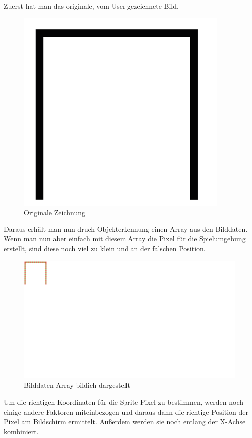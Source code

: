 Zuerst hat man das originale, vom User gezeichnete Bild.
\begin{figure}[H]
    \centering
    \includegraphics[scale=0.5]{pics/simpleDrawing.PNG}
    \caption{Originale Zeichnung}
\end{figure}

Daraus erhält man nun druch Objekterkennung einen Array aus den Bilddaten. Wenn man nun aber einfach mit diesem Array 
die Pixel für die Spielumgebung erstellt, sind diese noch viel zu klein und an der falschen Position.
\\
\begin{figure}[H]
    \centering
    \includegraphics[scale=0.5]{pics/simpleDrawing2.PNG}
    \caption{Bilddaten-Array bildich dargestellt}
\end{figure}

Um die richtigen Koordinaten für die Sprite-Pixel zu bestimmen, werden noch einige andere Faktoren miteinbezogen und daraus dann die richtige Position der Pixel am Bildschirm ermittelt.
Außerdem werden sie noch entlang der X-Achse kombiniert.

